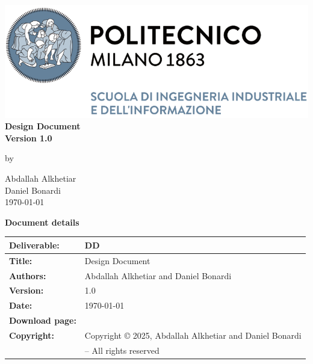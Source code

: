 \documentclass[11pt,twoside]{article}
\begin{document}
\begin{center}
\thispagestyle{empty}
\includegraphics[scale=1.25]{Images/PolimiLogo}\\
\vspace{4cm}
\textbf{\Huge{Design Document}}\\
\vspace{1.5cm}
\textbf{\Large{Version 1.0}}\\
\bigskip \par
by \par
\large{Abdallah Alkhetiar}\\
\large{Daniel Bonardi}\\
\bigskip \bigskip
\large{\today}
\end{center}

\newpage

\setcounter{page}{1}
\begin{center}
\textbf{\Huge{Document details}}
\end{center}
\begin{table}[h!]
\begin{tabu} to \textwidth { |X[0.25,r,p] || X[0.75,l,p]| }
\hline

\textbf{Deliverable:} & DD \\
\hline
\textbf{Title:} & Design Document \\
\hline
\textbf{Authors:} & Abdallah Alkhetiar and Daniel Bonardi \\
\hline
\textbf{Version:} & 1.0 \\ 
\hline
\textbf{Date:} & \today \\
\hline
\textbf{Download page:} & \href{https://github.com/Zero3474/AlkhetiarBonardi.git}{\texttt{\color{blue}{https://github.com/Zero3474/AlkhetiarBonardi.git}}} \\
\hline
\textbf{Copyright:} & Copyright © 2025, Abdallah Alkhetiar and Daniel Bonardi \\
& – All rights reserved \\
\hline
\end{tabu}
\end{table}
\end{document}
